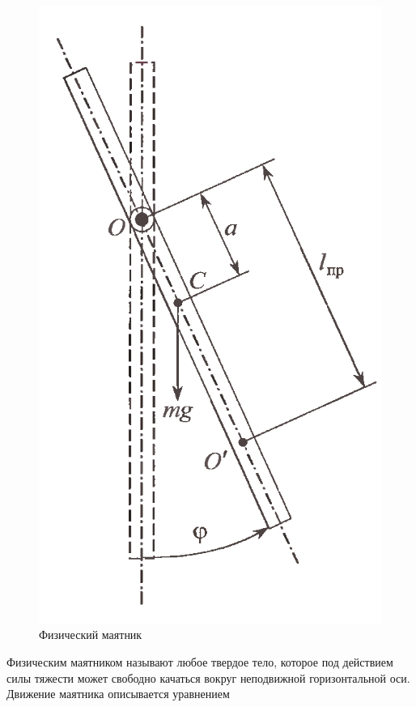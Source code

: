 \documentclass[a4paper,12pt]{article} %
\begin{document}
\begin{figure}
	\includegraphics[width=1\linewidth]{ustanovka.png}
	\caption{Физический маятник}\label{risunok}
\end{figure}

Физическим маятником называют любое твердое тело, которое под действием силы тяжести может свободно качаться вокруг неподвижной горизонтальной оси. Движение маятника ­описывается уравнением
\end{document}
